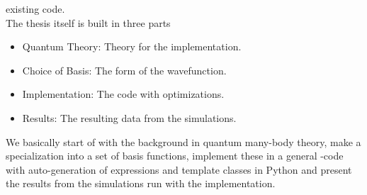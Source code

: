     existing code. \\
    The thesis itself is built in three parts
        \begin{itemize}
            \item Quantum Theory: Theory for the implementation.
            \item Choice of Basis: The form of the wavefunction.
            \item Implementation: The code with optimizations.
            \item Results: The resulting data from the simulations.
        \end{itemize}
    We basically start of with the background in quantum many-body theory, make
    a specialization into a set of basis functions, implement these in a
    general \CC-code with auto-generation of expressions and template classes
    in Python and present the results from the simulations run with the
    implementation.
